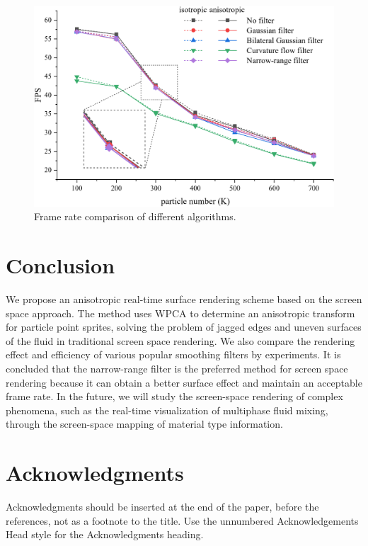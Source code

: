 \documentclass[times,twocolumn,final]{elsarticle}
\begin{document}
\begin{figure}[!t]
    \centering
    \includegraphics[width=\linewidth]{figs/FPS.png}
    \caption{Frame rate comparison of different algorithms.}
    \label{fig:figure8}
\end{figure}

\section{Conclusion}
We propose an anisotropic real-time surface rendering scheme based on the screen space approach. The method uses WPCA to determine an anisotropic transform for particle point sprites, solving the problem of jagged edges and uneven surfaces of the fluid in traditional screen space rendering. We also compare the rendering effect and efficiency of various popular smoothing filters by experiments. It is concluded that the narrow-range filter is the preferred method for screen space rendering because it can obtain a better surface effect and maintain an acceptable frame rate. In the future, we will study the screen-space rendering of complex phenomena, such as the real-time visualization of multiphase fluid mixing, through the screen-space mapping of material type information.


\section*{Acknowledgments}
Acknowledgments should be inserted at the end of the paper, before the
references, not as a footnote to the title. Use the unnumbered
Acknowledgements Head style for the Acknowledgments heading.






\end{document}
